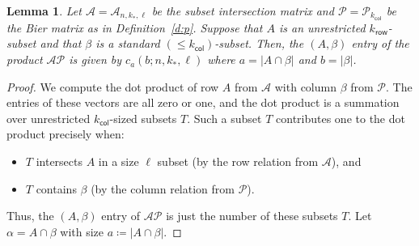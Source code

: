 \documentclass[11pt]{article}
\newtheorem{lemma}[theo]{Lemma}
\theoremstyle{definition}
\numberwithin{equation}{section}
\numberwithin{equation}{section}
\renewcommand{\P}{\mathcal{P}}
\newcommand{\A}{\mathcal{A}}
\newcommand{\kr}{{k}_{\mathsf{row}}}
\newcommand{\kc}{{k}_{\mathsf{col}}}
\newcommand{\kk}{{k}_{\mathsf{*}}}
\begin{document}
\begin{lemma}\label{l:ap_entries}
Let $\A = \A_{n,\kk,\ell}$ be the subset intersection matrix and $\P = \P_{\kc}$ be the Bier
matrix as in Definition~\ref{d:p}.  Suppose that $A$ is an unrestricted
$\kr$-subset and that $\beta$ is a standard $(\leq \kc)$-subset.  Then, the $(A,
\beta)$ entry of the product $\A\P$ is given by $c_a(b; n, \kk, \ell)$ where $a = |A
\cap \beta|$ and $b = |\beta|$.
\end{lemma}
\begin{proof}
We compute the dot product of row $A$ from $\A$ with column $\beta$ from $\P$.  The entries of these vectors are all zero or one, and the dot product is a summation over unrestricted $\kc$-sized subsets $T$.  Such a subset $T$ contributes one to the dot product precisely when:
\begin{itemize}
    \item $T$ intersects $A$ in a size $\ell$ subset (by the row relation from $\A$), and
    \item $T$ contains $\beta$ (by the column relation from $\P$).
\end{itemize}
Thus, the $(A, \beta)$ entry of $\A \P$ is just the number of these subsets $T$.  Let $\alpha = A \cap \beta$ with size $a \coloneqq  |A \cap \beta|$.  


\end{proof}
\end{document}
